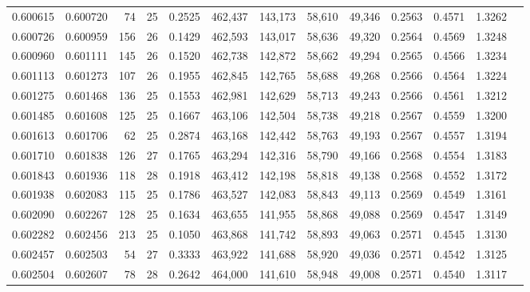 \begin{tabular}{rrrrrrrrrrrrr}
0.600615 & 0.600720 &    74 &  25 &                                     0.2525 & 462,437 & 143,173 &  58,610 &  49,346 & 0.2563 & 0.4571 & 1.3262 \\
0.600726 & 0.600959 &   156 &  26 &                                     0.1429 & 462,593 & 143,017 &  58,636 &  49,320 & 0.2564 & 0.4569 & 1.3248 \\
0.600960 & 0.601111 &   145 &  26 &                                     0.1520 & 462,738 & 142,872 &  58,662 &  49,294 & 0.2565 & 0.4566 & 1.3234 \\
0.601113 & 0.601273 &   107 &  26 &                                     0.1955 & 462,845 & 142,765 &  58,688 &  49,268 & 0.2566 & 0.4564 & 1.3224 \\
0.601275 & 0.601468 &   136 &  25 &                                     0.1553 & 462,981 & 142,629 &  58,713 &  49,243 & 0.2566 & 0.4561 & 1.3212 \\
0.601485 & 0.601608 &   125 &  25 &                                     0.1667 & 463,106 & 142,504 &  58,738 &  49,218 & 0.2567 & 0.4559 & 1.3200 \\
0.601613 & 0.601706 &    62 &  25 &                                     0.2874 & 463,168 & 142,442 &  58,763 &  49,193 & 0.2567 & 0.4557 & 1.3194 \\
0.601710 & 0.601838 &   126 &  27 &                                     0.1765 & 463,294 & 142,316 &  58,790 &  49,166 & 0.2568 & 0.4554 & 1.3183 \\
0.601843 & 0.601936 &   118 &  28 &                                     0.1918 & 463,412 & 142,198 &  58,818 &  49,138 & 0.2568 & 0.4552 & 1.3172 \\
0.601938 & 0.602083 &   115 &  25 &                                     0.1786 & 463,527 & 142,083 &  58,843 &  49,113 & 0.2569 & 0.4549 & 1.3161 \\
0.602090 & 0.602267 &   128 &  25 &                                     0.1634 & 463,655 & 141,955 &  58,868 &  49,088 & 0.2569 & 0.4547 & 1.3149 \\
0.602282 & 0.602456 &   213 &  25 &                                     0.1050 & 463,868 & 141,742 &  58,893 &  49,063 & 0.2571 & 0.4545 & 1.3130 \\
0.602457 & 0.602503 &    54 &  27 &                                     0.3333 & 463,922 & 141,688 &  58,920 &  49,036 & 0.2571 & 0.4542 & 1.3125 \\
0.602504 & 0.602607 &    78 &  28 &                                     0.2642 & 464,000 & 141,610 &  58,948 &  49,008 & 0.2571 & 0.4540 & 1.3117 \\

\end{tabular}
